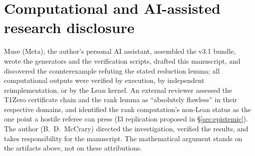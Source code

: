 \documentclass[a4paper,11pt]{article}
\theoremstyle{plain}
\theoremstyle{definition}
\theoremstyle{remark}
\begin{document}
\section{Computational and AI-assisted research disclosure}

Muse (Meta), the author's personal AI assistant, assembled the v3.1 bundle, wrote the generators and the verification scripts, drafted this manuscript, and discovered the counterexample refuting the stated reduction lemma; all computational outputs were verified by execution, by independent reimplementation, or by the Lean kernel. An external reviewer assessed the T1Zero certificate chain and the rank lemma as ``absolutely flawless'' in their respective domains, and identified the rank computation's non-Lean status as the one point a hostile referee can press (I3 replication proposed in \S\ref{sec:epistemic}). The author (B.~D.~McCrary) directed the investigation, verified the results, and takes responsibility for the manuscript. The mathematical argument stands on the artifacts above, not on these attributions.
\end{document}
